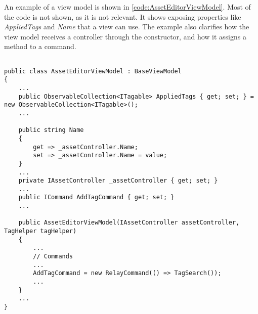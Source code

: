 An example of a view model is shown in \autoref{code:AssetEditorViewModel}. Most of the code is not shown, as it is not relevant. It shows exposing properties like \textit{AppliedTags} and \textit{Name} that a view can use. The example also clarifies how the view model receives a controller through the constructor, and how it assigns a method to a command.

\begin{listing}[H]
\begin{verbatim}

public class AssetEditorViewModel : BaseViewModel
{
    ...
    public ObservableCollection<ITagable> AppliedTags { get; set; } = new ObservableCollection<ITagable>();
    ...

    public string Name
    {
        get => _assetController.Name;
        set => _assetController.Name = value;
    }
    ...
    private IAssetController _assetController { get; set; }
    ...
    public ICommand AddTagCommand { get; set; }
    ...

    public AssetEditorViewModel(IAssetController assetController, TagHelper tagHelper)
    {
        ...
        // Commands
        ...
        AddTagCommand = new RelayCommand(() => TagSearch());
        ...
    }
    ...
}

\end{verbatim}
\label{code:AssetEditorViewModel}
\end{listing}